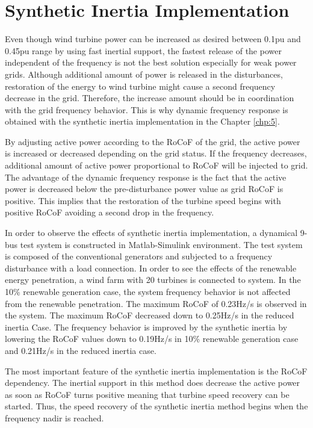 \section{Synthetic Inertia Implementation}
Even though wind turbine power can be increased as desired between 0.1pu and 0.45pu range by using fast inertial support, the fastest release of the power independent of the frequency is not the best solution especially for weak power grids. Although additional amount of power is released in the disturbances, restoration of the energy to wind turbine might cause a second frequency decrease in the grid. Therefore, the increase amount should be in coordination with the grid frequency behavior. This is why dynamic frequency response is obtained with the synthetic inertia implementation in the Chapter \ref{chp:5}. \par
By adjusting active power according to the RoCoF of the grid, the active power is increased or decreased depending on the grid status. If the frequency decreases, additional amount of active power proportional to RoCoF will be injected to grid. The advantage of the dynamic frequency response is the fact that the active power is decreased below the pre-disturbance power value as grid RoCoF is positive. This implies that the restoration of the turbine speed begins with positive RoCoF avoiding a second drop in the frequency.\par
In order to observe the effects of synthetic inertia implementation, a dynamical 9-bus test system is constructed in Matlab-Simulink environment. The test system is composed of the conventional generators and subjected to a frequency disturbance with a load connection. In order to see the effects of the renewable energy penetration, a wind farm with 20 turbines is connected to system. In the 10\% renewable generation case, the system frequency behavior is not affected from the renewable penetration. The maximum RoCoF of 0.23Hz/s is observed in the system. The maximum RoCoF decreased down to 0.25Hz/s in the reduced inertia Case. The frequency behavior is improved by the synthetic inertia by lowering the RoCoF values down to 0.19Hz/s in 10\% renewable generation case and 0.21Hz/s in the reduced inertia case.
\par
The most important feature of the synthetic inertia implementation is the RoCoF dependency. The inertial support in this method does decrease the active power as soon as RoCoF turns positive meaning that turbine speed recovery can be started. Thus, the speed recovery of the synthetic inertia method begins when the frequency nadir is reached.\par
